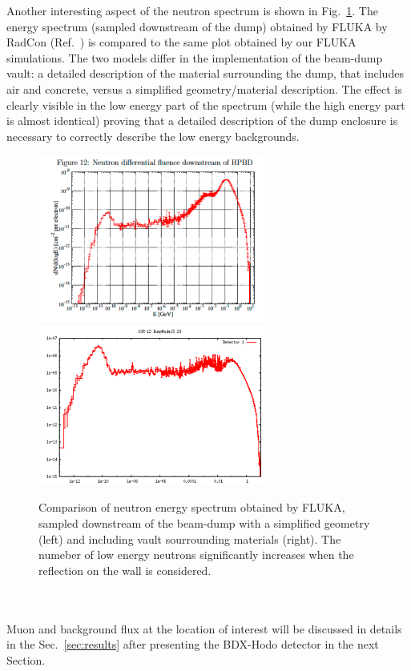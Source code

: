 Another interesting aspect of the neutron spectrum is shown in Fig.~\ref{fig:n-lowE}. The energy spectrum (sampled downstream of the dump) obtained by FLUKA by RadCon (Ref.~\cite{jnote-bd}) is compared to the same plot obtained by our FLUKA simulations. The two models differ in the implementation of the  beam-dump vault: a detailed description of the material surrounding the dump,  that includes air and concrete,  versus a simplified geometry/material description.   The effect is clearly visible in the low energy part of the spectrum (while the high energy part is almost identical) proving that a detailed description of the dump enclosure is necessary to correctly describe the low energy backgrounds.
\begin{figure}[h!] 
\center
\includegraphics[width=7.5cm]{figs/bg-lowN-george.pdf}    
\includegraphics[width=7.5cm]{figs/NeutronsDumpComparisonDnDlogE_1D.pdf}   
\caption{Comparison of neutron energy spectrum obtained by FLUKA, sampled downstream of the beam-dump with a simplified geometry (left) and including vault sourrounding materials (right). The numeber of low energy neutrons significantly increases when the reflection on the wall is considered.}
\label{fig:n-lowE}
\end{figure}
\\ \\ 
Muon and background flux  at  the location of interest will be discussed in details in the Sec.~\ref{sec:results} after presenting the BDX-Hodo detector in the next Section. 



